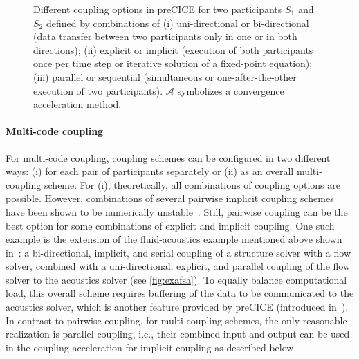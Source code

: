 \begin{figure}[h!]
 \caption{
\label{fig:cpl_simple}
Different coupling options in preCICE for two participants $S_1$ and $S_2$ defined by combinations of (i) uni-directional or bi-directional (data transfer between two participants only in one or in both directions); (ii) explicit or implicit (execution of both participants once per time step or iterative solution of a fixed-point equation); (iii) parallel or sequential (simultaneous or one-after-the-other execution of two participants). $\mathcal{A}$ symbolizes a convergence acceleration method.}
\end{figure}


\paragraph{Multi-code coupling} 
For multi-code coupling, coupling schemes can be configured in two different ways: (i) for each pair of participants separately or (ii) as an overall multi-coupling scheme. For (i), theoretically, all combinations of coupling options are possible. However, combinations of several pairwise implicit coupling schemes have been shown to be numerically unstable~\cite{Bungartz2014_MIQN_CompuMech}. Still, pairwise coupling can be the best option for some combinations of explicit and implicit coupling. One such example is the extension of the fluid-acoustics example mentioned above shown in~\cite{Lindner2020_ExaFSA}: a bi-directional, implicit, and serial coupling of a structure solver with a flow solver, combined with a uni-directional, explicit, and parallel coupling of the flow solver to the acoustics solver (see \autoref{fig:exafsa}). To equally balance computational load, this overall scheme requires buffering of the data to be communicated to the acoustics solver, which is another feature provided by preCICE (introduced in~\cite{Lindner2020_ExaFSA}). In contrast to pairwise coupling, for multi-coupling schemes, the only reasonable realization is parallel coupling, i.e., their combined input and output can be used in the coupling acceleration for implicit coupling as described below.


